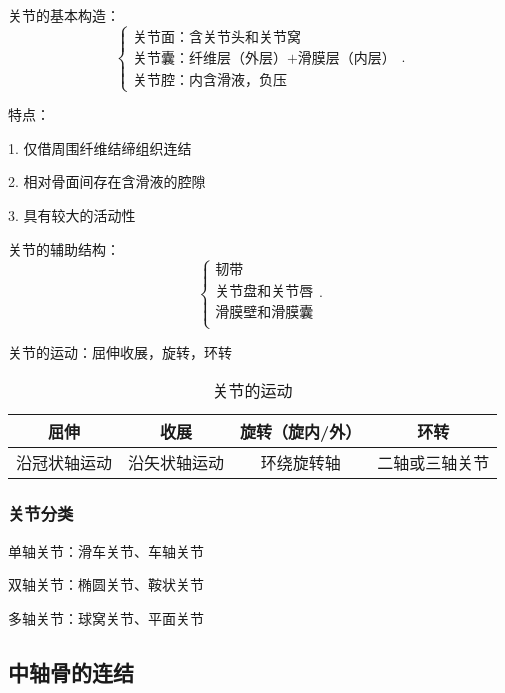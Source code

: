 \begin{notation}
    关节的基本构造：
    \[
        \begin{cases}
            \text{关节面：含关节头和关节窝}\\ 
            \text{关节囊：纤维层（外层）+滑膜层（内层）}\\ 
            \text{关节腔：内含滑液，负压}
        \end{cases}
    .\] 

    特点：

    1. 仅借周围纤维结缔组织连结

    2. 相对骨面间存在含滑液的腔隙

    3. 具有较大的活动性
\end{notation}
\begin{notation}
    关节的辅助结构：
    \[
        \begin{cases}
            \text{韧带}\\ 
            \text{关节盘和关节唇}\\ 
            \text{滑膜壁和滑膜囊}\\ 
        \end{cases}
    .\] 
\end{notation}
\begin{notation}
    关节的运动：屈伸收展，旋转，环转
    \begin{table}[htpb]
        \centering
        \caption{关节的运动}
        \label{tab:关节的运动}
        \begin{tabular}{cccc}
        \toprule
        屈伸 & 收展 & 旋转（旋内/外） & 环转\\
        \midrule
        沿冠状轴运动 & 沿矢状轴运动 & 环绕旋转轴 & 二轴或三轴关节\\
        \bottomrule
        \end{tabular}
    \end{table}
\end{notation}
\subsubsection*{关节分类}%
\label{subsub:关节分类}
\begin{notation}
    单轴关节：滑车关节、车轴关节

    双轴关节：椭圆关节、鞍状关节

    多轴关节：球窝关节、平面关节
\end{notation}
\subsection{中轴骨的连结}%
\label{sub:中轴骨的连结}
